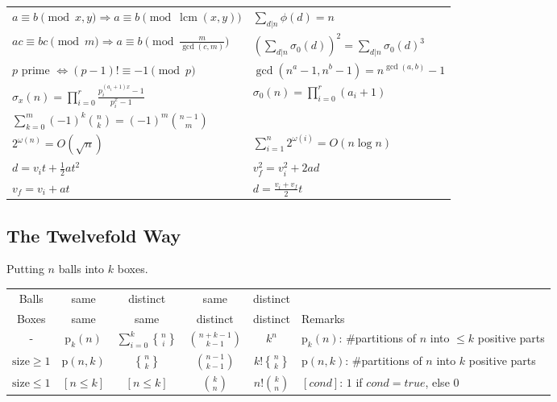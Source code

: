 \documentclass[11.5pt,a4paper,landscape,oneside]{amsart}
\DeclareMathOperator{\lcm}{lcm}
\DeclareRobustCommand{\stirling}{\genfrac\{\}{0pt}{}}
\begin{document}
\begin{multicols*}{2}
\begin{tabular}{ll}
        $a\equiv b\pmod{x,y} \Rightarrow a\equiv b\pmod{\lcm(x,y)}$ & $\sum_{d|n} \phi(d) = n$ \\
        $ac\equiv bc\pmod{m} \Rightarrow a\equiv b\pmod{\frac{m}{\gcd(c,m)}}$ & $(\sum_{d|n} \sigma_0(d))^2 = \sum_{d|n} \sigma_0(d)^3$ \\
        $p$ prime $\Leftrightarrow (p-1)!\equiv -1\pmod{p}$ & $\gcd(n^a-1,n^b-1) = n^{\gcd(a,b)}-1$ \\
        $\sigma_x(n) = \prod_{i=0}^{r} \frac{p_i^{(a_i + 1)x} - 1}{p_i^x - 1}$ & $\sigma_0(n) = \prod_{i=0}^r (a_i + 1)$ \\
        $\sum_{k=0}^m (-1)^k \binom{n}{k} = (-1)^m \binom{n-1}{m}$ & \\
        $2^{\omega(n)} = O(\sqrt{n})$ & $\sum_{i=1}^n 2^{\omega(i)} = O(n \log n)$ \\
        $d = v_i t + \frac{1}{2}at^2$ & $v_f^2 = v_i^2 + 2ad$ \\
        $v_f = v_i + at$ & $d = \frac{v_i + v_f}{2}t$ \\
    \end{tabular}
    \subsection{The Twelvefold Way}
        Putting $n$ balls into $k$ boxes.\\
    \begin{tabular}{@{}c|c|c|c|c|l@{}}
    Balls & same & distinct & same & distinct & \\
    Boxes & same & same & distinct & distinct & Remarks\\
    \hline
        - & $\mathrm{p}_k(n)$ & $\sum_{i=0}^k \stirling{n}{i}$ & $\binom{n+k-1}{k-1}$ & $k^n$ & $\mathrm{p}_k(n)$: \#partitions of $n$ into $\le k$ positive parts \\
        $\mathrm{size}\ge 1$ & $\mathrm{p}(n,k)$ & $\stirling{n}{k}$ & $\binom{n-1}{k-1}$ & $k!\stirling{n}{k}$ & $\mathrm{p}(n,k)$: \#partitions of $n$ into $k$ positive parts \\
        $\mathrm{size}\le 1$ & $[n \le k]$ & $[n \le k]$ & $\binom{k}{n}$ & $n!\binom{k}{n}$ & $[cond]$: $1$ if $cond=true$, else $0$\\
    \bottomrule
    \end{tabular}
\clearpage

\end{multicols*}
\end{document}
